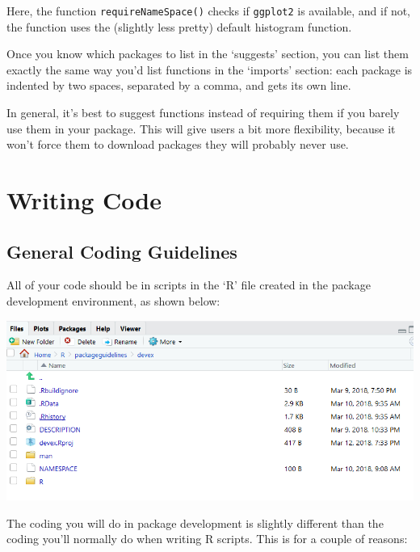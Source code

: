 \documentclass[
]{book}
\begin{document}
Here, the function \texttt{requireNameSpace()} checks if \texttt{ggplot2} is available, and if not, the function uses the (slightly less pretty) default histogram function.

Once you know which packages to list in the `suggests' section, you can list them exactly the same way you'd list functions in the `imports' section: each package is indented by two spaces, separated by a comma, and gets its own line.

In general, it's best to suggest functions instead of requiring them if you barely use them in your package. This will give users a bit more flexibility, because it won't force them to download packages they will probably never use.

\hypertarget{writing-code}{%
\section{Writing Code}\label{writing-code}}

\hypertarget{general-coding-guidelines}{%
\subsection{General Coding Guidelines}\label{general-coding-guidelines}}

All of your code should be in scripts in the `R' file created in the package development environment, as shown below:

\includegraphics{images/packageSS/code1.PNG}

The coding you will do in package development is slightly different than the coding you'll normally do when writing R scripts. This is for a couple of reasons:
\end{document}

